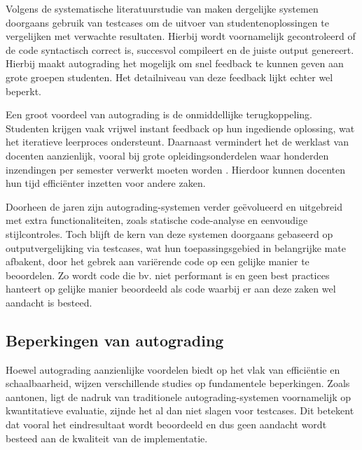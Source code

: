 \vspace{1em}

Volgens de systematische literatuurstudie van \textcite{Messer2024} maken dergelijke systemen doorgaans gebruik van testcases om de uitvoer van studentenoplossingen te vergelijken met verwachte resultaten. Hierbij wordt voornamelijk gecontroleerd of de code syntactisch correct is, succesvol compileert en de juiste output genereert. Hierbij maakt autograding het mogelijk om snel feedback te kunnen geven aan grote groepen studenten. Het detailniveau van deze feedback lijkt echter wel beperkt.

\vspace{1em}

Een groot voordeel van autograding is de onmiddellijke terugkoppeling. Studenten krijgen vaak vrijwel instant feedback op hun ingediende oplossing, wat het iteratieve leerproces ondersteunt. Daarnaast vermindert het de werklast van docenten aanzienlijk, vooral bij grote opleidingsonderdelen waar honderden inzendingen per semester verwerkt moeten worden \autocite{Messer2024}. Hierdoor kunnen docenten hun tijd efficiënter inzetten voor andere zaken.

\vspace{1em}

Doorheen de jaren zijn autograding-systemen verder geëvolueerd en uitgebreid met extra functionaliteiten, zoals statische code-analyse en eenvoudige stijlcontroles. Toch blijft de kern van deze systemen doorgaans gebaseerd op outputvergelijking via testcases, wat hun toepassingsgebied in belangrijke mate afbakent, door het gebrek aan variërende code op een gelijke manier te beoordelen. Zo wordt code die bv. niet performant is en geen best practices hanteert op gelijke manier beoordeeld als code waarbij er aan deze zaken wel aandacht is besteed.

\subsection{Beperkingen van autograding}

Hoewel autograding aanzienlijke voordelen biedt op het vlak van efficiëntie en schaalbaarheid, wijzen verschillende studies op fundamentele beperkingen. Zoals \textcite{Messer2024} aantonen, ligt de nadruk van traditionele autograding-systemen voornamelijk op kwantitatieve evaluatie, zijnde het al dan niet slagen voor testcases. Dit betekent dat vooral het eindresultaat wordt beoordeeld en dus geen aandacht wordt besteed aan de kwaliteit van de implementatie.

